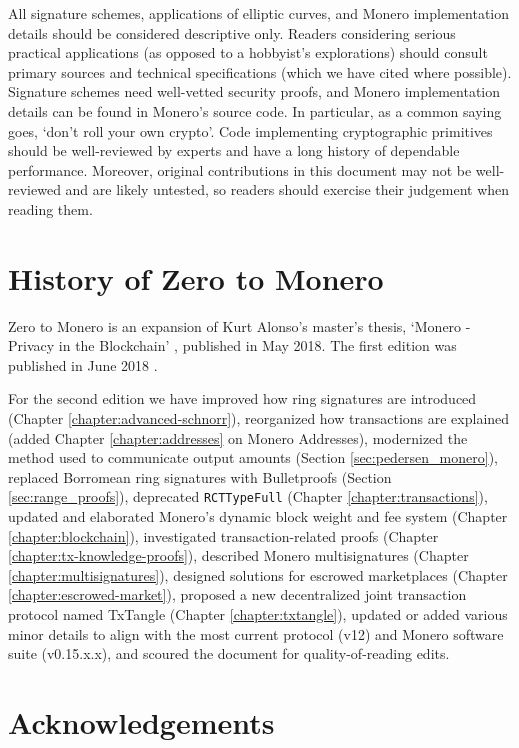 All signature schemes, applications of elliptic curves, and Monero implementation details should be considered descriptive only. Readers considering serious practical applications (as opposed to a hobbyist's explorations) should consult primary sources and technical specifications (which we have cited where possible). Signature schemes need well-vetted security proofs, and Monero implementation details can be found in Monero's source code. In particular, as a common saying goes, `don't roll your own crypto'. Code implementing cryptographic primitives should be well-reviewed by experts and have a long history of dependable performance. Moreover, original contributions in this document may not be well-reviewed and are likely untested, so readers should exercise their judgement when reading them.



\section{History of Zero to Monero}

Zero to Monero is an expansion of Kurt Alonso's master's thesis, `Monero - Privacy in the Blockchain' \cite{kurt-original}, published in May 2018. The first edition was published in June 2018 \cite{ztm-1}.

For the second edition we have improved how ring signatures are introduced (Chapter \ref{chapter:advanced-schnorr}), reorganized how transactions are explained (added Chapter \ref{chapter:addresses} on Monero Addresses), modernized the method used to communicate output amounts (Section \ref{sec:pedersen_monero}), replaced Borromean ring signatures with Bulletproofs (Section \ref{sec:range_proofs}), deprecated {\tt RCTTypeFull} (Chapter \ref{chapter:transactions}), updated and elaborated Monero's dynamic block weight and fee system (Chapter \ref{chapter:blockchain}), investigated transaction-related proofs (Chapter \ref{chapter:tx-knowledge-proofs}), described Monero multisignatures (Chapter \ref{chapter:multisignatures}), designed solutions for escrowed marketplaces (Chapter \ref{chapter:escrowed-market}), proposed a new decentralized joint transaction protocol named TxTangle (Chapter \ref{chapter:txtangle}), updated or added various minor details to align with the most current protocol (v12) and Monero software suite (v0.15.x.x), and scoured the document for quality-of-reading edits.



\section{Acknowledgements}
\label{sec:acknowledgements}

